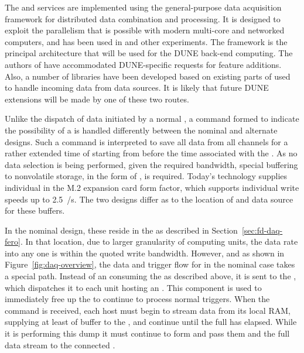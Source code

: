 The  and  services are implemented using
 the general-purpose \fnal data acquisition framework  for
distributed data combination and processing. 
It is designed to exploit the parallelism that is possible with
modern multi-core and networked computers, and has been used in  and other experiments.
The  framework is the principal architecture that will be used for the DUNE  back-end computing.
The authors of  have accommodated DUNE-specific 
requests for feature additions. Also, a number of libraries have been developed based on
existing parts of  used to handle incoming data from data
sources. 
It is likely that future DUNE extensions will be made by one of these two
routes.

Unlike the dispatch of data initiated by a normal ,
a command formed to indicate the possibility of a  is
handled differently between the nominal and alternate designs. 
Such a command is interpreted to save all data from all channels
for a rather extended time of \snbtime starting from \snbpretime
before the time associated with the . 
As no data selection is being performed, given the required bandwidth, special buffering to nonvolatile storage, in the form of , is required.  
Today's technology supplies individual  in the M.2 expansion card form factor,
which supports individual write speeds up to \SI{2.5}{\GB/\s}. 
The two designs differ as to the location of and data source for these
buffers.

In the nominal design, these  reside in the 
as described in Section~\ref{sec:fd-daq-fero}. 
In that location, due to larger granularity of computing units, the
data rate into any one  is within the quoted write
bandwidth. 
However, and as shown in Figure~\ref{fig:daq-overview}, the data and
trigger flow for  in the nominal case takes a special
path. 
Instead of an  consuming the  as
described above, it is sent to the , which dispatches
it to each  unit hosting an . 
This component is used %
to immediately free up the 
to continue to process normal triggers.
When the command is received, each host must begin to stream data from
its local RAM, supplying at least \snbpretime of buffer to the
, and continue until the full \snbtime has elapsed. 
While it is performing this dump it must continue to form
 and pass them and the full data stream to the
connected .

